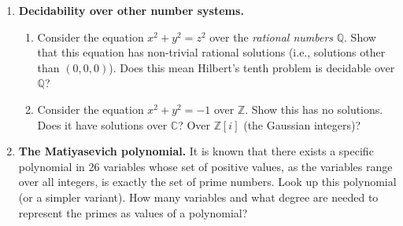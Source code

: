 \begin{enumerate}
    \item \textbf{Decidability over other number systems.}
    \begin{enumerate}
        \item Consider the equation $x^2 + y^2 = z^2$ over the \emph{rational numbers} $\mathbb{Q}$. Show that this equation has non-trivial rational solutions (i.e., solutions other than $(0,0,0)$). Does this mean Hilbert's tenth problem is decidable over $\mathbb{Q}$?
        \item Consider the equation $x^2 + y^2 = -1$ over $\mathbb{Z}$. Show this has no solutions. Does it have solutions over $\mathbb{C}$? Over $\mathbb{Z}[i]$ (the Gaussian integers)?
    \end{enumerate}

    \item[$\star$] \textbf{The Matiyasevich polynomial.} It is known that there exists a specific polynomial in 26 variables whose set of positive values, as the variables range over all integers, is exactly the set of prime numbers. Look up this polynomial (or a simpler variant). How many variables and what degree are needed to represent the primes as values of a polynomial?

\end{enumerate}

